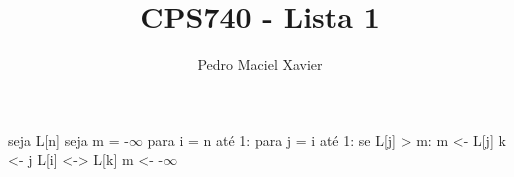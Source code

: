 \documentclass{homework}
\title{CPS740 - Lista 1}
\author{Pedro Maciel Xavier}
\begin{document}
\maketitle
	\quest{}
	\begin{algor}
seja L[n]
seja m = -$\infty$
para i = n até 1:
	para j = i até 1:
		se L[j] > m:
			m <- L[j]
			k <- j
	L[i] <-> L[k]
	m <- -$\infty$
	\end{algor}
	
\end{document}
